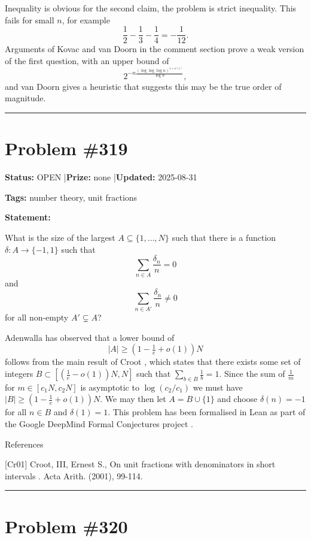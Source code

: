 \documentclass{article}
\begin{document}
Inequality is obvious for the second claim, the problem is strict inequality. This fails for small $n$, for example\[\frac{1}{2}-\frac{1}{3}-\frac{1}{4}=-\frac{1}{12}.\]Arguments of Kovac and van Doorn in the comment section prove a weak version of the first question, with an upper bound of\[2^{-n\frac{(\log\log\log n)^{1+o(1)}}{\log n}},\]and van Doorn gives a heuristic that suggests this may be the true order of magnitude.

\noindent\rule{\linewidth}{0.4pt}


\section{Problem \#319}
\label{prob:319}

\noindent\textbf{Status:} OPEN \quad|\quad \textbf{Prize:} none \quad|\quad \textbf{Updated:} 2025-08-31

\noindent\textbf{Tags:} number theory, unit fractions

\medskip

\noindent\textbf{Statement:}

What is the size of the largest $A\subseteq \{1,\ldots,N\}$ such that there is a function $\delta:A\to \{-1,1\}$ such that\[\sum_{n\in A}\frac{\delta_n}{n}=0\]and\[\sum_{n\in A'}\frac{\delta_n}{n}\neq 0\]for all non-empty $A'\subsetneq A$?




Adenwalla has observed that a lower bound of\[\lvert A\rvert\geq (1-\tfrac{1}{e}+o(1))N\]follows from the main result of Croot \cite{Cr01}, which states that there exists some set of integers $B\subset [(\frac{1}{e}-o(1))N,N]$ such that $\sum_{b\in B}\frac{1}{b}=1$. Since the sum of $\frac{1}{m}$ for $m\in [c_1N,c_2N]$ is asymptotic to $\log(c_2/c_1)$ we must have $\lvert B\rvert \geq (1-\tfrac{1}{e}+o(1))N$. We may then let $A=B\cup\{1\}$ and choose $\delta(n)=-1$ for all $n\in B$ and $\delta(1)=1$. This problem has been formalised in Lean as part of the Google DeepMind Formal Conjectures project .




References

[Cr01] Croot, III, Ernest S., On unit fractions with denominators in short intervals . Acta Arith. (2001), 99-114.

\noindent\rule{\linewidth}{0.4pt}


\section{Problem \#320}
\label{prob:320}
\end{document}
